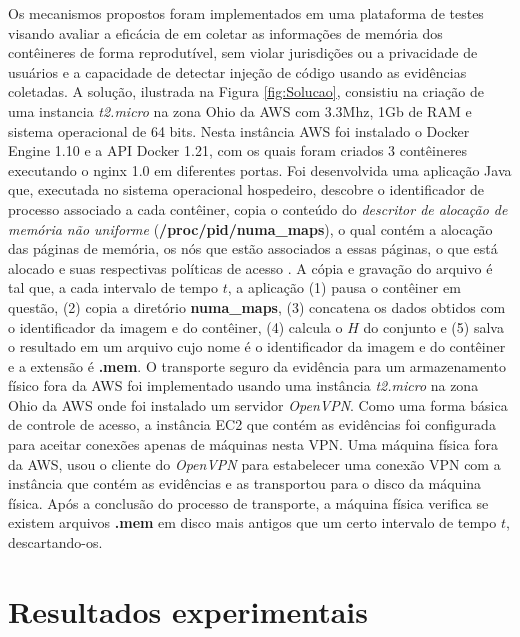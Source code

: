 %
Os mecanismos propostos foram implementados em uma plataforma de testes visando avaliar a eficácia de \fancyname em coletar as informações de memória dos contêineres de forma reprodutível, sem violar jurisdições ou a privacidade de usuários e a capacidade de detectar injeção de código usando as evidências coletadas.
%
A solução, ilustrada na Figura \ref{fig:Solucao}, consistiu na criação de uma instancia \textit{t2.micro} na zona Ohio da AWS com 3.3Mhz, 1Gb de RAM e sistema operacional de 64 bits. 
%
Nesta instância AWS foi instalado o Docker Engine 1.10 e a API Docker 1.21, com os quais foram criados 3 contêineres executando o nginx 1.0 em diferentes portas. 
%
Foi desenvolvida uma aplicação Java que, executada no sistema operacional hospedeiro, descobre o identificador de processo associado a cada contêiner, copia o conteúdo do \textit{descritor de alocação de memória não uniforme} (\textbf{/proc/pid/numa\_maps}), o qual contém a alocação das páginas de memória, os nós que estão associados a essas páginas, o que está alocado e suas respectivas políticas de acesso \cite{UnixManPagesNumaMaps}.
%
A cópia e gravação do arquivo é tal que, a cada intervalo de tempo $t$, a aplicação (1) pausa o contêiner em questão, (2) copia a diretório \textbf{numa\_maps}, (3)  concatena os dados obtidos com o identificador da imagem e do contêiner, (4) calcula o $H$ do conjunto e (5) salva o resultado em um arquivo cujo nome é o identificador da imagem e do contêiner e a extensão é \textbf{.mem}. 
%
O transporte seguro da evidência para um armazenamento físico fora da AWS foi implementado usando uma instância \textit{t2.micro} na zona Ohio da AWS onde foi instalado um servidor \textit{OpenVPN}.
%
Como uma forma básica de controle de acesso, a instância EC2 que contém as evidências foi configurada para aceitar conexões apenas de máquinas nesta VPN.
%
Uma máquina física fora da AWS, usou o cliente do \textit{OpenVPN} para estabelecer uma conexão VPN com a instância que contém as evidências e as transportou para o disco da máquina física.
%
Após a conclusão do processo de transporte, a máquina física verifica se existem arquivos \textbf{.mem} em disco mais antigos que um certo intervalo de tempo $t$, descartando-os.
%


\section{Resultados experimentais}
\label{sec:proposta-exp}

